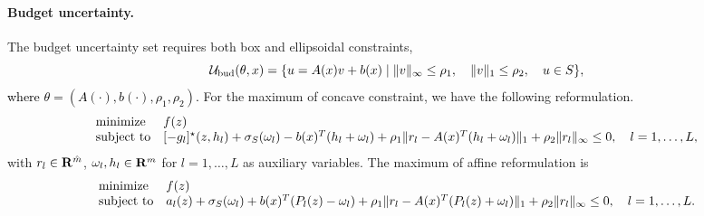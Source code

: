 \documentclass[11pt]{article}
\newcommand{\RC}[1]{\textcolor{black}{#1}}
\begin{document}
\begin{appendices}
\paragraph{Budget uncertainty.}
The budget uncertainty set requires both box and ellipsoidal constraints,
\RC{$$ \uncset_{\text{bud}}(\theta,x) = \{u = A\RC{(x)}v+b\RC{(x)} \mid \| v\|_\infty \leq \rho_1, \quad \| v \|_1 \leq \rho_2, \quad u \in S\},$$
where $\theta = (A(\cdot),b(\cdot), \rho_1, \rho_2)$.}
For the maximum of concave constraint, we have the following reformulation.
\begin{equation*}
	\begin{array}{ll}
		{\text{minimize}} & f(z) \\
		\mbox{subject to} & [-g_l]^\star(z,h_l)  + \sigma_S(\omega_l) -  b\RC{(x)}^T(h_l + \omega_l) + \rho_1\|r_l - A\RC{(x)}^T(h_l + \omega_l)\|_1  + \rho_2\|r_l\|_\infty \leq 0,\quad l =  1, \dots,L,	\end{array}
	\end{equation*}
with $r_l \in {\mathbf R}^{\hat{m}}$, $\omega_l, h_l \in {\mathbf R}^m$ for $l = 1,\dots,L$ as auxiliary variables. The maximum of affine reformulation is 
\begin{equation}
	\label{eq:budget_max}
	\begin{array}{ll}
		\mbox{minimize} & f(z)\\
		\mbox{subject to} &  a_l(z) + \sigma_S(\omega_l) + b\RC{(x)}^T(P_l(z) - \omega_l) + \rho_1\|r_l - A\RC{(x)}^T(P_l(z) +\omega_l)\|_1 + \rho_2\|r_l\|_\infty \leq 0, \quad l = 1,\dots,L.
	\end{array}
\end{equation}


\end{appendices}
\end{document}
